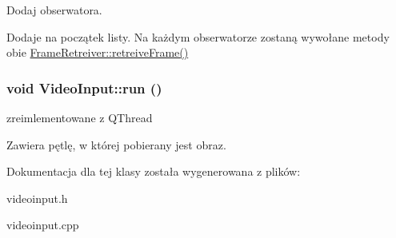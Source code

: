 Dodaj obserwatora. 

Dodaje na początek listy. Na każdym obserwatorze zostaną wywołane metody obie \hyperlink{class_frame_retreiver_061c97e43f3b73705903e49afad3e5bf}{FrameRetreiver::retreiveFrame()} \hypertarget{class_video_input_653a4568756629a94a3b6e2697973864}{
\subsubsection[{run}]{\setlength{\rightskip}{0pt plus 5cm}void VideoInput::run ()}}
\label{class_video_input_653a4568756629a94a3b6e2697973864}


zreimlementowane z QThread 

Zawiera pętlę, w której pobierany jest obraz. 

Dokumentacja dla tej klasy została wygenerowana z plików:\begin{CompactItemize}
\item 
videoinput.h\item 
videoinput.cpp\end{CompactItemize}
